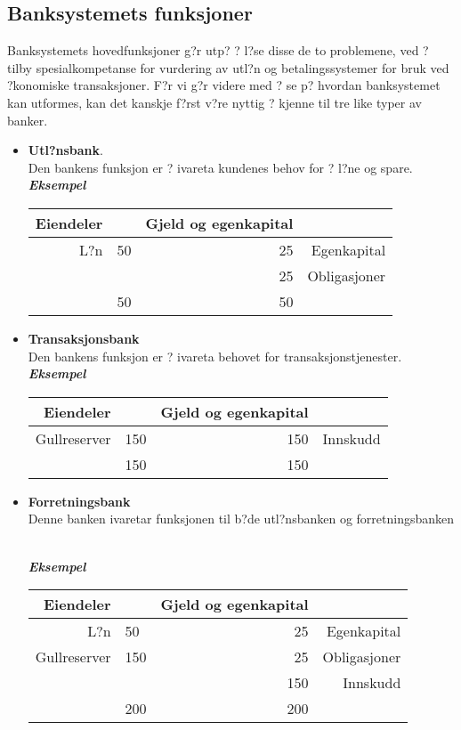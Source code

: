 \documentclass[a4paper,notitlepage]{article}
\begin{document}
\subsection{Banksystemets funksjoner}
Banksystemets hovedfunksjoner g?r utp? ? l?se disse de to problemene, ved ? tilby spesialkompetanse for vurdering av utl?n og betalingssystemer for bruk ved ?konomiske transaksjoner. F?r vi g?r videre med ? se p? hvordan banksystemet kan utformes, kan det kanskje f?rst v?re nyttig ? kjenne til tre like typer av banker.
\begin{itemize}
\item \textbf{Utl?nsbank}.\\
Den bankens funksjon er ? ivareta kundenes behov  for  ? l?ne og spare.\\

\noindent\textbf{\emph{Eksempel}}\\
\begin{tabular}{rlrr}
    \textbf{Eiendeler} & \textbf{} & \textbf{Gjeld og egenkapital} & \textbf{} \\
\hline    L?n   & 50    & 25    & Egenkapital \\
          &       & 25    & Obligasjoner \\
\hline          & 50    & 50    &  \\
\end{tabular}%
\end{itemize}
\begin{itemize}
\item \textbf{Transaksjonsbank}\\
Den bankens funksjon er ? ivareta behovet for transaksjonstjenester.\\

\noindent\textbf{\emph{Eksempel}}\

\begin{tabular}{rlrr}
 \textbf{Eiendeler} & \textbf{} & \textbf{Gjeld og egenkapital} & \textbf{}\\
\hline    Gullreserver &  150   & 150   & Innskudd \\
\hline                 & 150   & 150   &  \\
\end{tabular}
\end{itemize}
\begin{itemize}
\item \textbf{Forretningsbank} \\
Denne banken ivaretar funksjonen til b?de utl?nsbanken og forretningsbanken

\noindent \\\textbf{\emph{Eksempel}}\\
\begin{tabular}{rlrr}
    \textbf{Eiendeler} & \textbf{} & \textbf{Gjeld og egenkapital} & \textbf{} \\
\hline    L?n   & 50    & 25    & Egenkapital \\
    Gullreserver  &  150   & 25    & Obligasjoner \\
          &       & 150   & Innskudd \\
\hline          & 200   & 200   &  \\
\end{tabular}%
\end{itemize}
\end{document}
